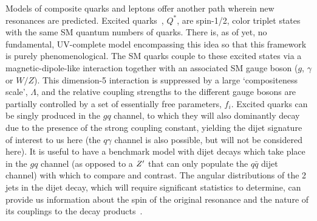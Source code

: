 Models of composite quarks and leptons offer another path wherein new resonances are predicted. Excited quarks~\cite{Baur:1987ga,Baur:1989kv}, $Q^*$, are spin-1/2, color triplet
states with the same SM quantum numbers of quarks. %
There is, as of yet, no fundamental, UV-complete
model encompassing this idea so that this framework is purely phenomenological. The SM quarks couple to these excited states via a magnetic-dipole-like interaction together with an associated SM gauge boson ($g$, $\gamma$ or $W/Z$). This dimension-5 interaction is suppressed by a large `compositeness scale', $\Lambda$, and the relative coupling strengths to the different gauge bosons are partially controlled by a set of essentially free parameters, $f_i$. Excited quarks can be singly produced in
the $gq$ channel, to which they will also dominantly decay due to the presence of the strong coupling constant, yielding the dijet signature of interest to us here (the $q\gamma$ channel is also possible, but will not be considered here). It is useful to have a benchmark model with dijet decays which take place in the $gq$ channel (as opposed to a $Z^{\prime}$ that can
only populate the $q\bar q$ dijet channel) with which to compare and contrast. The angular distributions of the 2 jets in the dijet decay, which will require significant statistics to
determine, can provide
us information about the spin of the original resonance and the nature of its couplings to the decay products~\cite{Harris:2011bh,Boelaert:2009jm,Chivukula:2014pma,Chivukula:2017nvl}.

